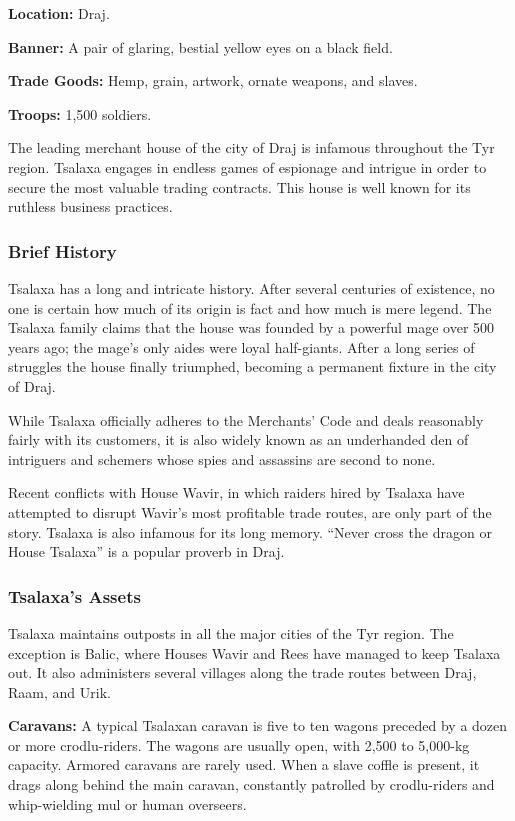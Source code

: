 \textbf{Location:} Draj.

\textbf{Banner:} A pair of glaring, bestial yellow eyes on a black field.

\textbf{Trade Goods:} Hemp, grain, artwork, ornate weapons, and slaves.

\textbf{Troops:} 1,500 soldiers.

The leading merchant house of the city of Draj is infamous throughout the Tyr region. Tsalaxa engages in endless games of espionage and intrigue in order to secure the most valuable trading contracts. This house is well known for its ruthless business practices.

\subsubsection{Brief History}
Tsalaxa has a long and intricate history. After several centuries of existence, no one is certain how much of its origin is fact and how much is mere legend. The Tsalaxa family claims that the house was founded by a powerful mage over 500 years ago; the mage's only aides were loyal half-giants. After a long series of struggles the house finally triumphed, becoming a permanent fixture in the city of Draj.

While Tsalaxa officially adheres to the Merchants' Code and deals reasonably fairly with its customers, it is also widely known as an underhanded den of intriguers and schemers whose spies and assassins are second to none.

Recent conflicts with House Wavir, in which raiders hired by Tsalaxa have attempted to disrupt Wavir's most profitable trade routes, are only part of the story. Tsalaxa is also infamous for its long memory. ``Never cross the dragon or House Tsalaxa'' is a popular proverb in Draj.

\subsubsection{Tsalaxa's Assets}
Tsalaxa maintains outposts in all the major cities of the Tyr region. The exception is Balic, where Houses Wavir and Rees have managed to keep Tsalaxa out. It also administers several villages along the trade routes between Draj, Raam, and Urik.

\textbf{Caravans:} A typical Tsalaxan caravan is five to ten wagons preceded by a dozen or more crodlu-riders. The wagons are usually open, with 2,500 to 5,000-kg capacity. Armored caravans are rarely used. When a slave coffle is present, it drags along behind the main caravan, constantly patrolled by crodlu-riders and whip-wielding mul or human overseers.

